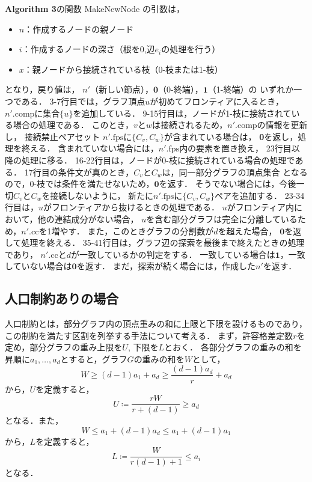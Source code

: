 \textbf{Algorithm 3}の関数 MakeNewNode の引数は，
\begin{itemize}
  \item $n$：作成するノードの親ノード
  \item $i$：作成するノードの深さ（根を0,辺$e_i$の処理を行う）
  \item $x$：親ノードから接続されている枝（0-枝または1-枝）
\end{itemize}
となり，戻り値は，
$n'$（新しい節点），$\textbf{0}$（0-終端），$\textbf{1}$（1-終端）の
いずれか一つである．
3-7行目では，グラフ頂点$u$が初めてフロンティアに入るとき，
$n'.\mathrm{comp}$に集合$\{u\}$を追加している．
9-15行目は，ノードが1-枝に接続されている場合の処理である．
このとき，$v$と$w$は接続されるため，$n'.\mathrm{comp}$の情報を更新し，
接続禁止ペアセット $n'.\mathrm{fps}$に$\{C_v,C_w\}$が含まれている場合は，
\textbf{0}を返し，処理を終える．
含まれていない場合には，$n'.\mathrm{fps}$内の要素を置き換え，
23行目以降の処理に移る．
16-22行目は，ノードが0-枝に接続されている場合の処理である．
17行目の条件文が真のとき，$C_v$と$C_w$は，同一部分グラフの頂点集合
となるので，0-枝では条件を満たせないため，$\textbf{0}$を返す．
そうでない場合には，今後一切$C_v$と$C_w$を接続しないように，
新たに$n'.\mathrm{fps}$に$\{C_v, C_w\}$ペアを追加する．
23-34行目は，$u$がフロンティアから抜けるときの処理である．
$u$がフロンティア内において，他の連結成分がない場合，
$u$を含む部分グラフは完全に分離しているため，$n'.\mathrm{cc}$を1増やす．
また，このときグラフの分割数が$d$を超えた場合，
$\textbf{0}$を返して処理を終える．
35-41行目は，グラフ辺の探索を最後まで終えたときの処理であり，
$n'.\mathrm{cc}$と$d$が一致しているかの判定をする．
一致している場合は$\textbf{1}$，一致していない場合は$\textbf{0}$を返す．
まだ，探索が続く場合には，作成した$n'$を返す．

\subsection{人口制約ありの場合}
人口制約とは，部分グラフ内の頂点重みの和に上限と下限を設けるものであり，
この制約を満たす区割を列挙する手法について考える．
まず，許容格差定数$r$を定め，部分グラフの重み上限を$U$, 下限を$L$とおく．
各部分グラフの重みの和を昇順に$a_1,\ldots,a_{d}$とすると，グラフ$G$の重みの和を$W$として，
$$ W \ge (d-1)a_1+a_{d} \ge \frac{(d-1)a_{d}}{r} + a_{d} $$
から，$U$を定義すると，
$$ U \coloneqq \frac{rW}{r+(d-1)} \ge	a_{d}$$
となる．また，
$$ W \le a_1+(d-1)a_{d} \le a_1+(d-1)a_{1} $$
から，$L$を定義すると，
$$ L \coloneqq \frac{W}{r(d-1)+1} \le a_i $$
となる．

